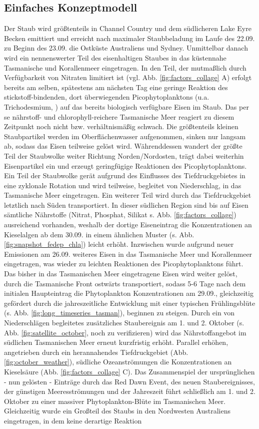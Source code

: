 \documentclass[12pt,a4paper,onecolumn]{scrartcl}
\begin{document}
\subsection{Einfaches Konzeptmodell}
Der Staub wird größtenteils in Channel Country und dem südlicheren Lake Eyre Becken emittiert und erreicht nach maximaler Staubbeladung im Laufe des 22.09. zu Beginn des 23.09. die Ostküste Australiens und Sydney. Unmittelbar danach wird ein nennenswerter Teil des eisenhaltigen Staubes in das küstennahe Tasmanische und Korallenmeer eingetragen. In den Teil, der mutmaßlich durch Verfügbarkeit von  Nitraten limitiert ist (vgl. Abb. \ref{fig:factors_collage} A) erfolgt bereits am selben, spätestens am nächsten Tag eine geringe Reaktion des stickstoff-bindenden, dort überwiegenden Picophytoplanktons (u.a. Trichodesmium, \cite{Rubin.2011}) auf das bereits biologisch verfügbare Eisen im Staub. Das per se nährstoff- und chlorophyll-reichere Tasmanische Meer reagiert zu diesem Zeitpunkt noch nicht bzw. verhältnismäßig schwach. Die größtenteils kleinen Staubpartikel werden im Oberflächenwasser aufgenommen, sinken nur langsam ab, sodass das Eisen teilweise gelöst wird. Währenddessen wandert der größte Teil der Staubwolke weiter Richtung Norden/Nordosten, trägt dabei weiterhin Eisenpartikel ein und erzeugt geringfügige Reaktionen des Picophytoplanktons. Ein Teil der Staubwolke gerät aufgrund des Einflusses des Tiefdruckgebietes in eine zyklonale Rotation und wird teilweise, begleitet von Niederschlag, in das Tasmanische Meer eingetragen. Ein weiterer Teil wird durch das Tiefdruckgebiet letztlich nach Süden transportiert. In dieser südlichen Region sind bis auf Eisen sämtliche Nährstoffe (Nitrat, Phosphat, Silikat s. Abb. \ref{fig:factors_collage}) ausreichend vorhanden, weshalb der dortige Eiseneintrag die Konzentrationen an Kieselalgen ab dem 30.09. in einem ähnlichen Muster (s. Abb. \ref{fig:snapshot_fedep_chla}) leicht erhöht. Inzwischen wurde aufgrund neuer Emissionen am 26.09. weiteres Eisen in das Tasmanische Meer und Korallenmeer eingetragen, was wieder zu leichten Reaktionen des Picophytoplanktons führt. Das bisher in das Tasmanischen Meer eingetragene Eisen wird weiter gelöst, durch die Tasmanische Front ostwärts transportiert, sodass 5-6 Tage nach dem initialen Haupteintrag die Phytoplankton Konzentrationen am 29.09., gleichzeitig gefördert durch die jahreszeitliche Entwicklung mit einer typischen Frühlingsblüte (s. Abb. \ref{fig:long_timeseries_tasman}), beginnen zu steigen. Durch ein von Niederschlägen begleitetes zusätzliches Staubereignis am 1. und 2. Oktober (s. Abb. \ref{fig:satellite_october}, noch zu verifizieren) wird das Nährstoffangebot im südlichen Tasmanischen Meer erneut kurzfristig erhöht. Parallel erhöhen, angetrieben durch ein herannahendes Tiefdruckgebiet (Abb. \ref{fig:october_weather}), südliche Ozeanströmungen die Konzentrationen an Kieselsäure (Abb. \ref{fig:factors_collage} C). Das Zusammenspiel der ursprünglichen - nun gelösten - Einträge durch das Red Dawn Event, des neuen Staubereignisses, der günstigen Meeresströmungen und der Jahreszeit führt schließlich am 1. und 2. Oktober zu einer massiver Phytoplankton-Blüte im Tasmanischen Meer. Gleichzeitig wurde ein Großteil des Staubs in den Nordwesten Australiens eingetragen, in dem keine derartige Reaktion 
\end{document}
